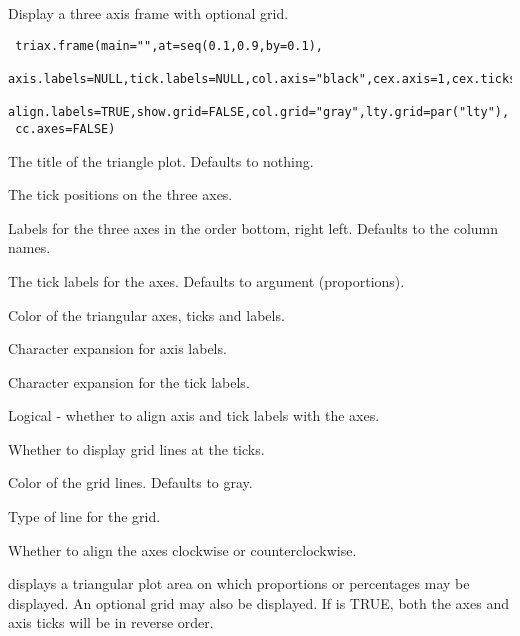 \begin{Description}\relax
Display a three axis frame with optional grid.
\end{Description}
\begin{Usage}
\begin{verbatim}
 triax.frame(main="",at=seq(0.1,0.9,by=0.1),
 axis.labels=NULL,tick.labels=NULL,col.axis="black",cex.axis=1,cex.ticks=1,
 align.labels=TRUE,show.grid=FALSE,col.grid="gray",lty.grid=par("lty"),
 cc.axes=FALSE)
\end{verbatim}
\end{Usage}
\begin{Arguments}
\begin{ldescription}
\item[\code{main}] The title of the triangle plot. Defaults to nothing.
\item[\code{at}] The tick positions on the three axes.
\item[\code{axis.labels}] Labels for the three axes in the order bottom, right
left. Defaults to the column names.
\item[\code{tick.labels}] The tick labels for the axes.
Defaults to argument  (proportions).
\item[\code{col.axis}] Color of the triangular axes, ticks and labels.
\item[\code{cex.axis}] Character expansion for axis labels.
\item[\code{cex.ticks}] Character expansion for the tick labels.
\item[\code{align.labels}] Logical - whether to align axis and tick labels with
the axes.
\item[\code{show.grid}] Whether to display grid lines at the ticks.
\item[\code{col.grid}] Color of the grid lines. Defaults to gray.
\item[\code{lty.grid}] Type of line for the grid.
\item[\code{cc.axes}] Whether to align the axes clockwise or counterclockwise.
\end{ldescription}
\end{Arguments}
\begin{Details}\relax
{} displays a triangular plot area on which proportions
or percentages may be displayed. An optional grid may also be displayed.
If  is TRUE, both the axes and axis ticks will be in
reverse order.
\end{Details}
